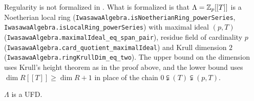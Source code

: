 \begin{remark}
Regularity is not formalized in {\Lean}. What is formalized is that
$\Lambda={\mathbb {Z}}_p[[T]]$ is a Noetherian local ring
(\texttt{IwasawaAlgebra.isNoetherianRing\_powerSeries},
\texttt{IwasawaAlgebra.isLocalRing\_powerSeries}) with maximal ideal $(p,T)$
(\texttt{IwasawaAlgebra.maximalIdeal\_eq\_span\_pair}), residue field of
cardinality $p$ (\texttt{IwasawaAlgebra.card\_quotient\_maximalIdeal}) and Krull
dimension $2$ (\texttt{IwasawaAlgebra.ringKrullDim\_eq\_two}). The upper bound
on the dimension uses Krull's height theorem as in the proof above, and the
lower bound uses $\dim R[[T]]\geq\dim R+1$ in place of the chain
$0\subsetneqq(T)\subsetneqq(p,T)$.
\end{remark}

\begin{cor}
\label{Lambda-is-UFD}
\leanok
$\Lambda$ is a UFD.
\end{cor}

